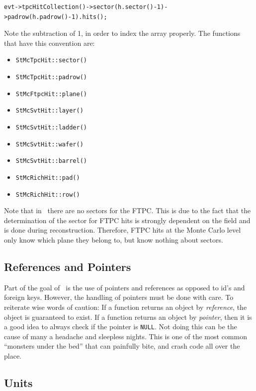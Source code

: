 \begin{verbatim}
evt->tpcHitCollection()->sector(h.sector()-1)->padrow(h.padrow()-1).hits();
\end{verbatim}
Note the subtraction of 1, in order to index the array properly.
The functions that have this convention are:

\begin{itemize}
	\item \texttt{StMcTpcHit::sector()}
	\item \texttt{StMcTpcHit::padrow()}
	\item \texttt{StMcFtpcHit::plane()}
	\item \texttt{StMcSvtHit::layer()}
	\item \texttt{StMcSvtHit::ladder()}
	\item \texttt{StMcSvtHit::wafer()}
	\item \texttt{StMcSvtHit::barrel()}
	\item \texttt{StMcRichHit::pad()}
	\item \texttt{StMcRichHit::row()}
\end{itemize}

Note that in \StMcEvent\ there are no sectors for the FTPC.  This is due to the
fact that the determination of the sector for FTPC hits is strongly dependent
on the field and is done during reconstruction.  Therefore, FTPC hits
at the Monte Carlo level only know which plane they belong to, but know
nothing about sectors.

\subsection {References and Pointers}
Part of the goal of \StMcEvent\ is the use of pointers and references
as opposed to id's and foreign keys.  However, the handling of
pointers must be done with care.
To reiterate wise words of caution: If a function returns an object by
\textit{reference},
the object is guaranteed to exist.  If a function returns an object by {\it pointer},
then it is a good idea to always check if the pointer is \verb+NULL+. Not doing
this can be the cause of many a headache and sleepless nights.  This is one of
the most common ``monsters under the bed'' that can painfully bite, 
and crash code all over the place.

\subsection{Units}
 
\label{sec:units}

